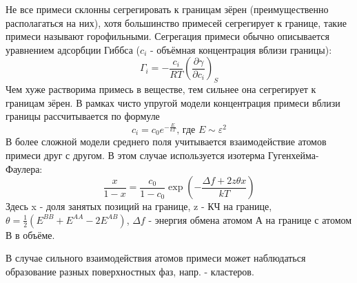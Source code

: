 \par
Не все примеси склонны сегрегировать к границам зёрен (преимущественно располагаться на них), хотя большинство примесей сегрегирует к границе, такие примеси называют горофильными. Сегрегация примеси обычно описывается уравнением адсорбции Гиббса ($c_i$ - объёмная концентрация вблизи границы):
\begin{equation}
 \Gamma_i = - \frac{c_i}{RT} \left(\frac{\partial \gamma}{\partial c_i} \right)_S
\label{eq:Gibbs_adsorbtion} 
\end{equation}
Чем хуже растворима примесь в веществе, тем сильнее она сегрегирует к границам зёрен. В рамках чисто упругой модели концентрация примеси вблизи границы рассчитывается по формуле 
\begin{equation}
 c_i=c_0e^{-\frac{E}{kT}} \text{, где } E\sim \varepsilon^2
\label{eq:elastic_model_concentrarion} 
\end{equation}
В более сложной модели среднего поля учитывается взаимодействие атомов примеси друг с другом. В этом случае используется изотерма Гугенхейма-Фаулера:
\begin{equation}
 \frac{x}{1-x} = \frac{c_0}{1-c_0}\exp (-\frac{\Delta f +2z\theta x}{kT})
\label{eq:elastic_model_concentrarion}  
\end{equation}
Здесь x - доля занятых позиций на границе, z - КЧ на границе, $\theta = \frac{1}{2} (E^{BB} + E^{AA} - 2E^{AB})$, $\Delta f$ - энергия обмена атомом А на границе с атомом В в объёме. \par
В случае сильного взаимодействия атомов примеси может наблюдаться образование разных поверхностных фаз, напр. - кластеров.
